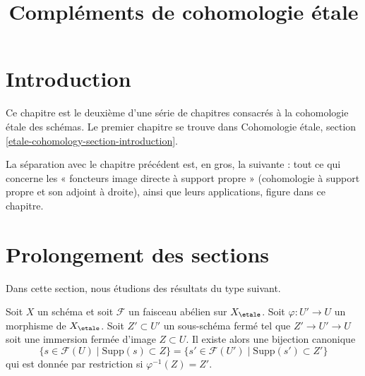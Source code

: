 

%


\title{Compléments de cohomologie étale}


\maketitle

\label{section-phantom}

\tableofcontents


\section{Introduction}
\label{section-introduction}

\noindent
Ce chapitre est le deuxième d'une série de chapitres consacrés à la cohomologie
étale des schémas. Le premier chapitre se trouve dans
Cohomologie étale, section \ref{etale-cohomology-section-introduction}.

\medskip\noindent
La séparation avec le chapitre précédent est, en gros, la suivante : tout ce
qui concerne les « foncteurs image directe à support propre » (cohomologie à support propre
et son adjoint à droite), ainsi que leurs applications, figure dans ce chapitre.






\section{Prolongement des sections}
\label{section-growing}

\noindent
Dans cette section, nous étudions des résultats du type suivant.

\begin{lemma}
\label{lemma-section-support-in-locally-closed-pre}
Soit $X$ un schéma et soit $\mathcal{F}$ un faisceau abélien sur $X_\etale$.
Soit $\varphi : U' \to U$ un morphisme de $X_\etale$. Soit $Z' \subset U'$ un
sous-schéma fermé tel que $Z' \to U' \to U$ soit une immersion fermée
d'image $Z \subset U$. Il existe alors une bijection canonique
$$
\{s \in \mathcal{F}(U) \mid \text{Supp}(s) \subset Z\} =
\{s' \in \mathcal{F}(U') \mid \text{Supp}(s') \subset Z'\}
$$
qui est donnée par restriction si $\varphi^{-1}(Z) = Z'$.
\end{lemma}

